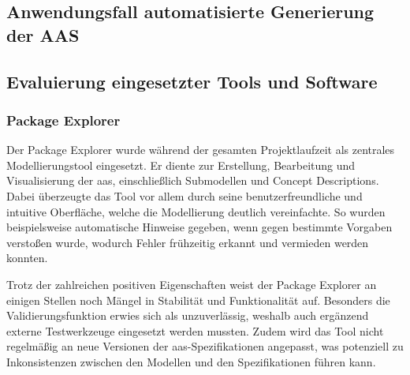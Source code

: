 \subsection{Anwendungsfall automatisierte Generierung der AAS}

\subsection{Evaluierung eingesetzter Tools und Software}
\subsubsection{Package Explorer}

Der Package Explorer wurde während der gesamten Projektlaufzeit als zentrales Modellierungstool eingesetzt. 
Er diente zur Erstellung, Bearbeitung und Visualisierung der \acs{aas}, einschließlich Submodellen und Concept Descriptions.
Dabei überzeugte das Tool vor allem durch seine benutzerfreundliche und intuitive Oberfläche, welche die Modellierung deutlich vereinfachte. 
So wurden beispielsweise automatische Hinweise gegeben, wenn gegen bestimmte Vorgaben verstoßen wurde, wodurch Fehler frühzeitig erkannt und vermieden werden konnten.

Trotz der zahlreichen positiven Eigenschaften weist der Package Explorer an einigen Stellen noch Mängel in Stabilität und Funktionalität auf. 
Besonders die Validierungsfunktion erwies sich als unzuverlässig, weshalb auch ergänzend externe Testwerkzeuge eingesetzt werden mussten. 
Zudem wird das Tool nicht regelmäßig an neue Versionen der \acs{aas}-Spezifikationen angepasst, was potenziell zu Inkonsistenzen zwischen den Modellen und den Spezifikationen führen kann.



